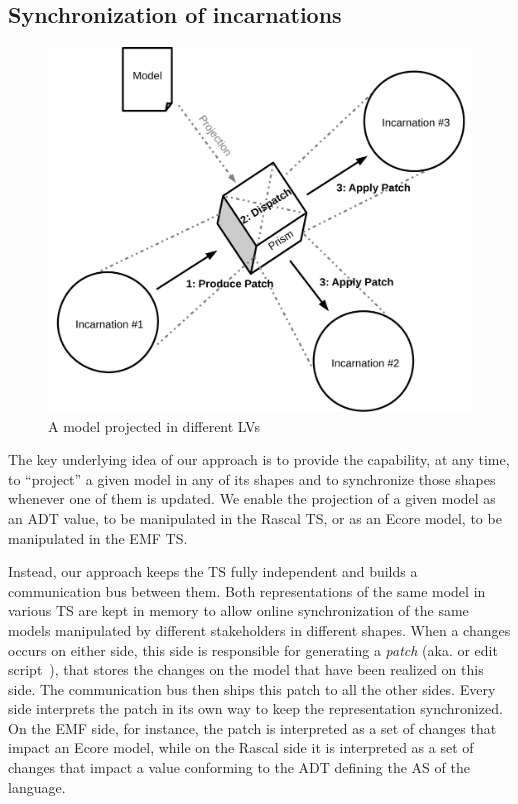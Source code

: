 
\subsection{Synchronization of incarnations}

\begin{figure}
	\centering
	\includegraphics[width=.6\columnwidth]{figures/prism}
	\caption{A model projected in different LVs}
	\label{fig:prism}
\end{figure}

The key underlying idea of our approach is to provide the capability, at any time, to ``project'' a given model in any of its shapes and to synchronize those shapes whenever one of them is updated.
We enable the projection of a given model as an ADT value, to be manipulated in the Rascal TS, or as an Ecore model, to be manipulated in the EMF TS.

Instead, our approach keeps the TS fully independent and builds a communication bus between them.
Both representations of the same model in various TS are kept in memory to allow online synchronization of the same models manipulated by different stakeholders in different shapes.
When a changes occurs on either side, this side is responsible for generating a \emph{patch} (aka. \de or edit script~\cite{rozen2017towards}), that stores the changes on the model that have been realized on this side.
The communication bus then ships this patch to all the other sides.
Every side interprets the patch in its own way to keep the representation synchronized.
On the EMF side, for instance, the patch is interpreted as a set of changes that impact an Ecore model, while on the Rascal side it is interpreted as a set of changes that impact a value conforming to the ADT defining the AS of the language.

